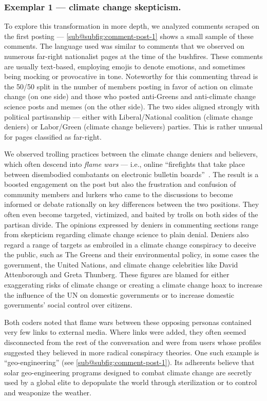 \subsubsection*{Exemplar 1 --- climate change skepticism.}
To explore this transformation in more depth, we analyzed comments scraped on the first posting --- \cref{sub@subfig:comment-post-1} shows a small sample of these comments.
The language used was similar to comments that we observed on numerous far-right nationalist pages at the time of the bushfires.
These comments are usually text-based, employing emojis to denote emotions, and sometimes being mocking or provocative in tone. 
Noteworthy for this commenting thread is the 50/50 split in the number of members posting in favor of action on climate change (on one side) and those who posted anti-Greens and anti-climate change science posts and memes (on the other side).
The two sides aligned strongly with political partisanship --- either with Liberal/National coalition (climate change deniers) or Labor/Green (climate change believers) parties. 
This is rather unusual for pages classified as far-right. 

We observed trolling practices between the climate change deniers and believers, which often descend into \emph{flame wars} --- i.e., online ``firefights that take place between disembodied combatants on electronic bulletin boards''~\citep{bukatman1994flame}.
The result is a boosted engagement on the post but also the frustration and confusion of community members and lurkers who came to the discussions to become informed or debate rationally on key differences between the two positions.
They often even become targeted, victimized, and baited by trolls on both sides of the partisan divide. 
The opinions expressed by deniers in commenting sections range from skepticism regarding climate change science to plain denial.
Deniers also regard a range of targets as embroiled in a climate change conspiracy to deceive the public, such as The Greens and their environmental policy, in some cases the government, the United Nations, and climate change celebrities like David Attenborough and Greta Thunberg. 
These figures are blamed for either exaggerating risks of climate change or creating a climate change hoax to increase the influence of the UN on domestic governments or to increase domestic governments' social control over citizens. 

Both coders noted that flame wars between these opposing personas contained very few links to external media. 
Where links were added, they often seemed disconnected from the rest of the conversation and were from users whose profiles suggested they believed in more radical conspiracy theories.
One such example is ``geo-engineering'' (see \cref{sub@subfig:comment-post-1}).
Its adherents believe that solar geo-engineering programs designed to combat climate change are secretly used by a global elite to depopulate the world through sterilization or to control and weaponize the weather.

